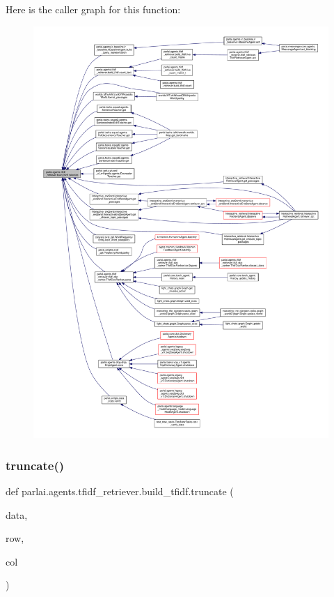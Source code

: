 Here is the caller graph for this function\+:
\nopagebreak
\begin{figure}[H]
\begin{center}
\leavevmode
\includegraphics[width=350pt]{namespaceparlai_1_1agents_1_1tfidf__retriever_1_1build__tfidf_a1fdb457e98eb4e4c26047e229686a616_icgraph}
\end{center}
\end{figure}
\mbox{\label{namespaceparlai_1_1agents_1_1tfidf__retriever_1_1build__tfidf_a5bd546d494142d2d7e2772a3d60583f9}} 
\subsubsection{\texorpdfstring{truncate()}{truncate()}}
{\footnotesize\ttfamily def parlai.\+agents.\+tfidf\+\_\+retriever.\+build\+\_\+tfidf.\+truncate (\begin{DoxyParamCaption}\item[{}]{data,  }\item[{}]{row,  }\item[{}]{col }\end{DoxyParamCaption})}




